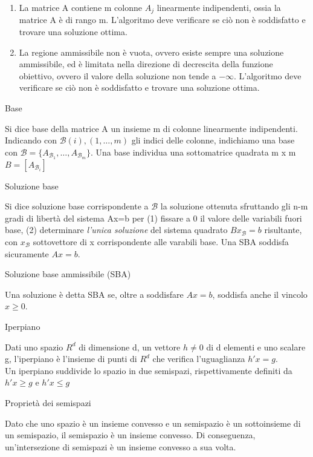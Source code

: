 \documentclass[answers, a4paper, 11pt]{exam}
\begin{document}
\begin{questions}
\begin{solution}
\begin{enumerate}
 \item La matrice A contiene m colonne $A_{j}$ linearmente indipendenti, ossia la matrice A è di rango m. L'algoritmo deve verificare se ciò non è soddisfatto e trovare una soluzione ottima.
 \item La regione ammissibile non è vuota, ovvero esiste sempre una soluzione ammissibile, ed è limitata nella direzione di decrescita della funzione obiettivo, ovvero il valore della soluzione non tende a $-\infty$. L'algoritmo deve verificare se ciò non è soddisfatto e trovare una soluzione ottima.
\end{enumerate}
\end{solution}
\question Base
\begin{solution}
Si dice base della matrice A un insieme m di colonne linearmente indipendenti. Indicando con $\mathcal{B}(i), (1,\ldots, m)$ gli indici delle colonne, indichiamo una base con $\mathcal{B} = \{A_{\mathcal{B}_{1}}, \ldots, A_{\mathcal{B}_{m}}\}$. Una base individua una sottomatrice quadrata m x m $B =[A_{\mathcal{B}_{i}}]$
\end{solution}
\question Soluzione base
\begin{solution}
Si dice soluzione base corrispondente a $\mathcal{B}$ la soluzione ottenuta sfruttando gli n-m gradi di libertà del sistema Ax=b per (1) fissare a 0 il valore delle variabili fuori base, (2) determinare \emph{l'unica soluzione} del sistema quadrato $Bx_{\mathcal{B}}=b$ risultante, con $x_{\mathcal{B}}$ sottovettore di x corrispondente alle varabili base. Una SBA soddisfa sicuramente $Ax=b$.
\end{solution}
\question Soluzione base ammissibile (SBA)
\begin{solution}
Una soluzione è detta SBA se, oltre a soddisfare $Ax=b$, soddisfa anche il vincolo $x \ge 0$.
\end{solution}
\question Iperpiano
\begin{solution}
Dati uno spazio $R^{d}$ di dimensione d, un vettore $h\ne 0$ di d elementi e uno scalare g, l'iperpiano è l'insieme di punti di $R^{d}$ che verifica l'uguaglianza $h'x = g$.\\ Un iperpiano suddivide lo spazio in due semispazi, rispettivamente definiti da $h'x \ge g$ e $h'x \le g$
\end{solution}
\question Proprietà dei semispazi
\begin{solution}
Dato che uno spazio è un insieme convesso e un semispazio è un sottoinsieme di un semispazio, il semispazio è un insieme convesso. Di conseguenza, un'intersezione di semispazi è un insieme convesso a sua volta.

\end{solution}
\end{questions}
\end{document}
